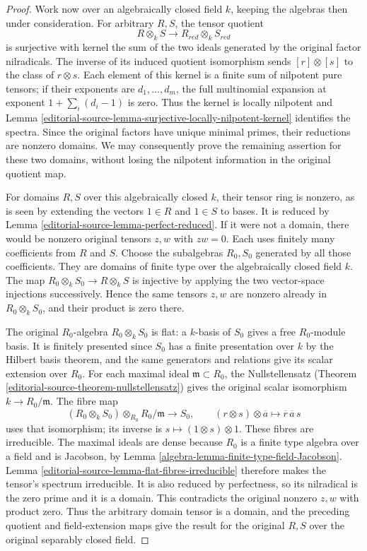 \begin{proof}
Work now over an algebraically
closed field $k$, keeping the
algebras then under consideration.
For arbitrary $R,S$, the tensor
quotient
$$
R\otimes_k S\longrightarrow R_{red}\otimes_k S_{red}
$$
is surjective with kernel
the sum of the two ideals
generated by the original factor
nilradicals. The inverse of its
induced quotient isomorphism
sends $[r]\otimes[s]$ to the
class of $r\otimes s$.
Each element of this kernel is
a finite sum of nilpotent pure
tensors; if their exponents are
$d_1,\ldots,d_m$, the full
multinomial expansion at exponent
$1+\sum_i(d_i-1)$ is zero.
Thus the kernel is locally
nilpotent and Lemma
\ref{editorial-source-lemma-surjective-locally-nilpotent-kernel}
identifies the spectra.
Since the original factors have
unique minimal primes, their
reductions are nonzero domains.
We may consequently prove the
remaining assertion for these
two domains, without losing the
nilpotent information in the
original quotient map.

For domains $R,S$ over this
algebraically closed $k$, their
tensor ring is nonzero, as is
seen by extending the vectors
$1\in R$ and $1\in S$ to bases.
It is reduced by Lemma
\ref{editorial-source-lemma-perfect-reduced}.
If it were not a domain, there
would be nonzero original tensors
$z,w$ with $zw=0$. Each uses
finitely many coefficients from
$R$ and $S$. Choose the subalgebras
$R_0,S_0$ generated by all those
coefficients. They are domains
of finite type over the
algebraically closed field $k$.
The map $R_0\otimes_k S_0\to R\otimes_k S$
is injective by applying the
two vector-space injections
successively. Hence the same
tensors $z,w$ are nonzero already
in $R_0\otimes_k S_0$, and
their product is zero there.

The original $R_0$-algebra
$R_0\otimes_k S_0$ is flat:
a $k$-basis of $S_0$ gives a
free $R_0$-module basis.
It is finitely presented since
$S_0$ has a finite presentation
over $k$ by the Hilbert basis
theorem, and the same generators
and relations give its scalar
extension over $R_0$.
For each maximal ideal
$\mathfrak m\subset R_0$, the
Nullstellensatz (Theorem \ref{editorial-source-theorem-nullstellensatz}) gives the
original scalar isomorphism
$k\to R_0/\mathfrak m$.
The fibre map
$$
(R_0\otimes_k S_0)\otimes_{R_0}R_0/\mathfrak m
\longrightarrow S_0,
\qquad(r\otimes s)\otimes\overline a
\longmapsto\overline r\,\overline a\,s
$$
uses that isomorphism; its
inverse is $s\mapsto(1\otimes s)\otimes1$.
These fibres are irreducible.
The maximal ideals are dense
because $R_0$ is a finite type
algebra over a field and is
Jacobson, by Lemma
\ref{algebra-lemma-finite-type-field-Jacobson}.
Lemma \ref{editorial-source-lemma-flat-fibres-irreducible}
therefore makes the tensor's
spectrum irreducible. It is
also reduced by perfectness,
so its nilradical is the zero
prime and it is a domain.
This contradicts the original
nonzero $z,w$ with product zero.
Thus the arbitrary domain tensor
is a domain, and the preceding
quotient and field-extension
maps give the result for the
original $R,S$ over the original
separably closed field.
\end{proof}


